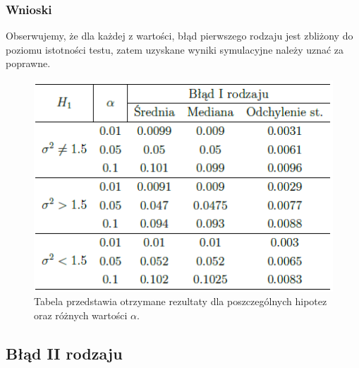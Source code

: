 \documentclass{article}
\begin{document}
\subsubsection{Wnioski}
Obserwujemy, że dla każdej z wartości, błąd pierwszego rodzaju jest zbliżony do poziomu istotności testu, zatem uzyskane wyniki symulacyjne należy uznać za poprawne.

\begin{figure}[H]
    \centering
    \includegraphics[scale=0.65]{tabelka_var1.png}
    \caption{Tabela przedstawia otrzymane rezultaty dla poszczególnych hipotez oraz różnych wartości $\alpha$.}
    \label{fig:6}
\end{figure}
\subsection{Błąd II rodzaju}
\end{document}
